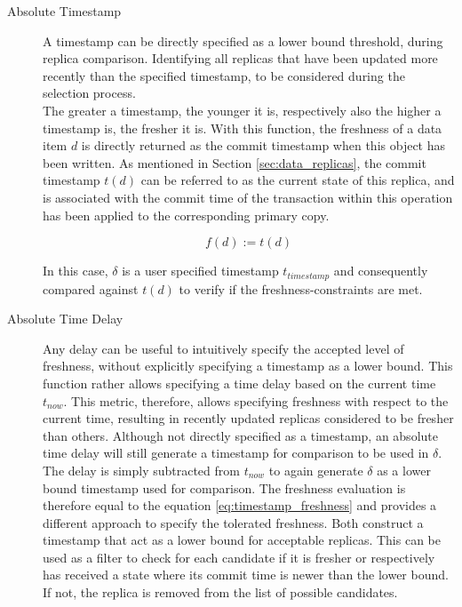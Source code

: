 \begin{description} \label{desc}
    \item [Absolute Timestamp]  A timestamp can be directly specified as a lower bound threshold, during replica comparison. Identifying all replicas that have been updated 
    more recently than the specified timestamp, to be considered during the selection process.\\
    The greater a timestamp, the younger it is, respectively also the higher a timestamp is, the fresher it is.
    With this function, the freshness of a data item $d$ is directly returned as the commit timestamp when this object has been written.
    As mentioned in Section \ref{sec:data_replicas}, the commit timestamp $t(d)$ can be referred to as the current state of this replica, and is associated with the commit time 
    of the transaction within this operation has been applied to the corresponding primary copy.

    \begin{equation} \label{eq:timestamp_freshness}
        f(d) := t(d)
    \end{equation}

    In this case, $\delta$ is a user specified timestamp $t_{timestamp}$ and consequently compared against $t(d)$ to verify if the freshness-constraints are met.


    \item [Absolute Time Delay] Any delay can be useful to intuitively specify the accepted level of freshness, without explicitly specifying a timestamp as a lower bound.
    This function rather allows specifying a time delay based on the current time $t_{now}$. 
    This metric, therefore, allows specifying freshness with respect to the current time, resulting in recently updated replicas considered to be fresher than others. 
    Although not directly specified as a timestamp, an absolute time delay will still generate a timestamp for comparison to be used in $\delta$.
    The delay is simply subtracted from $t_{now}$ to again generate $\delta$ as a lower bound timestamp used for comparison.
    The freshness evaluation is therefore equal to the equation \ref{eq:timestamp_freshness} and provides a different approach to specify the tolerated freshness.
    Both construct a timestamp that act as a lower bound for acceptable replicas.
    This can be used as a filter to check for each candidate if it is fresher or respectively has received a state where its commit time is newer 
    than the lower bound. If not, the replica is removed from the list of possible candidates. 




\end{description}
